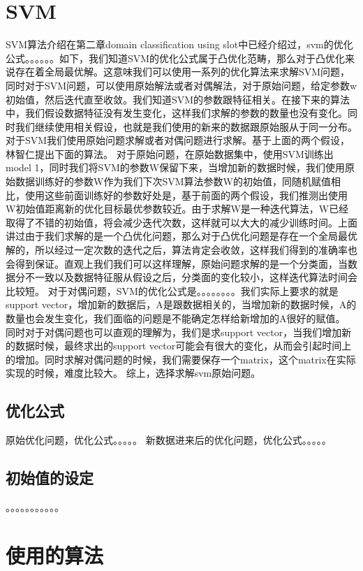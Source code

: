 \documentclass[master]{njuthesis}
\begin{document}
\section{SVM}
SVM算法介绍在第二章domain classification using slot中已经介绍过，svm的优化公式。。。。。。如下，我们知道SVM的优化公式属于凸优化范畴，那么对于凸优化来说存在着全局最优解。这意味我们可以使用一系列的优化算法来求解SVM问题，同时对于SVM问题，可以使用原始解法或者对偶解法，对于原始问题，给定参数w初始值，然后迭代直至收敛。我们知道SVM的参数跟特征相关。在接下来的算法中，我们假设数据特征没有发生变化，这样我们求解的参数的数量也没有变化。同时我们继续使用相关假设，也就是我们使用的新来的数据跟原始服从于同一分布。
对于SVM我们使用原始问题求解或者对偶问题进行求解。基于上面的两个假设，林智仁提出下面的算法。
对于原始问题，在原始数据集中，使用SVM训练出model 1，同时我们将SVM的参数W保留下来，当增加新的数据时候，我们使用原始数据训练好的参数W作为我们下次SVM算法参数W的初始值，同随机赋值相比，使用这些前面训练好的参数好处是，基于前面的两个假设，我们推测出使用W初始值距离新的优化目标最优参数较近。由于求解W是一种迭代算法，W已经取得了不错的初始值，将会减少迭代次数，这样就可以大大的减少训练时间。上面讲过由于我们求解的是一个凸优化问题，那么对于凸优化问题是存在一个全局最优解的，所以经过一定次数的迭代之后，算法肯定会收敛，这样我们得到的准确率也会得到保证。直观上我们我们可以这样理解，原始问题求解的是一个分类面，当数据分不一致以及数据特征服从假设之后，分类面的变化较小，这样迭代算法时间会比较短。
对于对偶问题，SVM的优化公式是。。。。。。。。我们实际上要求的就是support vector，增加新的数据后，A是跟数据相关的，当增加新的数据时候，A的数量也会发生变化，我们面临的问题是不能确定怎样给新增加的A很好的赋值。
同时对于对偶问题也可以直观的理解为，我们是求support vector，当我们增加新的数据时候，最终求出的support vector可能会有很大的变化，从而会引起时间上的增加。同时求解对偶问题的时候，我们需要保存一个matrix，这个matrix在实际实现的时候，难度比较大。
综上，选择求解svm原始问题。

\subsection{优化公式}
原始优化问题，优化公式。。。。。
新数据进来后的优化问题，优化公式。。。。。

\subsection{初始值的设定}
。。。。。。。。。。。

\section{使用的算法}
\end{document}
